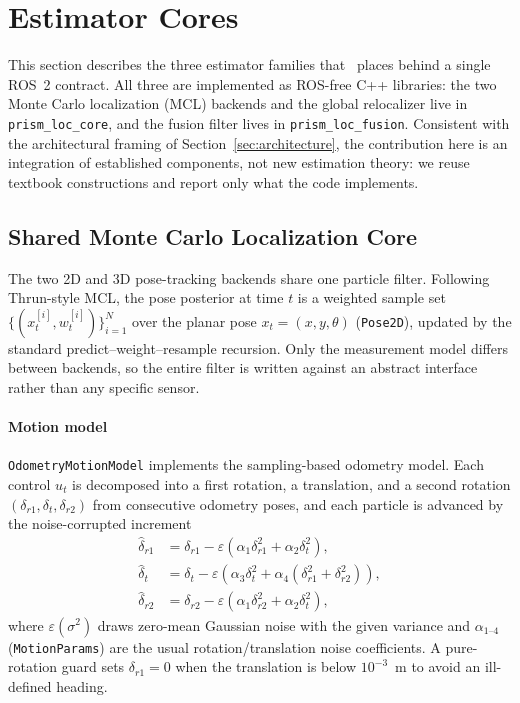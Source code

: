 \section{Estimator Cores}\label{sec:cores}

This section describes the three estimator families that \prismloc\ places
behind a single ROS~2 contract. All three are implemented as ROS-free C++
libraries: the two Monte Carlo localization (MCL) backends and the global
relocalizer live in \texttt{prism\_loc\_core}, and the fusion filter lives in
\texttt{prism\_loc\_fusion}. Consistent with the architectural framing of
Section~\ref{sec:architecture}, the contribution here is an integration of
established components, not new estimation theory: we reuse textbook
constructions and report only what the code implements.

\subsection{Shared Monte Carlo Localization Core}

The two 2D and 3D pose-tracking backends share one particle filter. Following
Thrun-style MCL, the pose posterior at time $t$ is a weighted sample set
$\{(x_t^{[i]}, w_t^{[i]})\}_{i=1}^{N}$ over the planar pose
$x_t = (x, y, \theta)$ (\texttt{Pose2D}), updated by the standard
predict--weight--resample recursion. Only the measurement model differs between
backends, so the entire filter is written against an abstract interface rather
than any specific sensor.

\paragraph{Motion model} \texttt{OdometryMotionModel} implements the
sampling-based odometry model. Each control $u_t$ is decomposed into a first
rotation, a translation, and a second rotation
$(\delta_{r1}, \delta_{t}, \delta_{r2})$ from consecutive odometry poses, and
each particle is advanced by the noise-corrupted increment
\begin{align}
\hat{\delta}_{r1} &= \delta_{r1} - \varepsilon(\alpha_1 \delta_{r1}^2 + \alpha_2 \delta_{t}^2), \nonumber\\
\hat{\delta}_{t}  &= \delta_{t}  - \varepsilon(\alpha_3 \delta_{t}^2 + \alpha_4(\delta_{r1}^2 + \delta_{r2}^2)), \nonumber\\
\hat{\delta}_{r2} &= \delta_{r2} - \varepsilon(\alpha_1 \delta_{r2}^2 + \alpha_2 \delta_{t}^2),
\end{align}
where $\varepsilon(\sigma^2)$ draws zero-mean Gaussian noise with the given
variance and $\alpha_{1\text{--}4}$ (\texttt{MotionParams}) are the usual
rotation/translation noise coefficients. A pure-rotation guard sets
$\delta_{r1}=0$ when the translation is below $10^{-3}$~m to avoid an ill-defined
heading.


